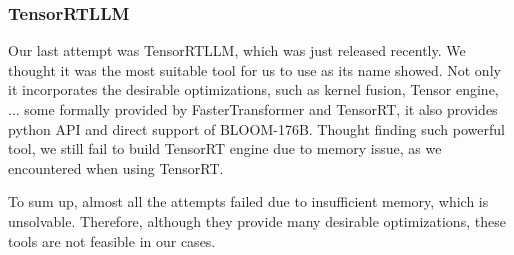 \subsubsection{TensorRTLLM}
Our last attempt was TensorRTLLM, which was just released recently. We thought it was the most suitable tool for us to use as its name showed. Not only it incorporates the desirable optimizations, such as kernel fusion, Tensor engine, ... some formally provided by FasterTransformer and TensorRT, it also provides python API and direct support of BLOOM-176B.
Thought finding such powerful tool, we still fail to build TensorRT engine due to memory issue, as we encountered when using TensorRT.

To sum up, almost all the attempts failed due to insufficient memory, which is unsolvable. Therefore, although they provide many desirable optimizations, these tools are not feasible in our cases.